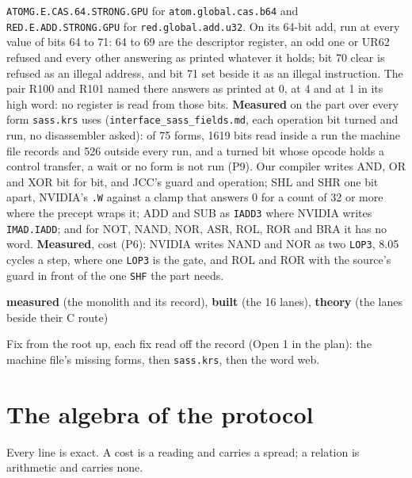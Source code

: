 \begin{description}
\texttt{ATOMG.\allowbreak{}E.\allowbreak{}CAS.\allowbreak{}64.\allowbreak{}STRONG.\allowbreak{}GPU} for \texttt{atom.\allowbreak{}global.\allowbreak{}cas.\allowbreak{}b64} and \texttt{RED.\allowbreak{}E.\allowbreak{}ADD.\allowbreak{}STRONG.\allowbreak{}GPU} for \texttt{red.\allowbreak{}global.\allowbreak{}add.\allowbreak{}u32}. On its 64-bit add, run at every value of bits 64 to 71: 64 to 69 are the descriptor register, an odd one or UR62 refused and every other answering as printed whatever it holds; bit 70 clear is refused as an illegal address, and bit 71 set beside it as an illegal instruction. The pair R100 and R101 named there answers as printed at 0, at 4 and at 1 in its high word: no register is read from those bits. \textbf{Measured} on the part over every form \texttt{sass.\allowbreak{}krs} uses (\texttt{interface\_\allowbreak{}sass\_\allowbreak{}fields.\allowbreak{}md}, each operation bit turned and run, no disassembler asked): of 75 forms, 1619 bits read inside a run the machine file records and 526 outside every run, and a turned bit whose opcode holds a control transfer, a wait or no form is not run (P9). Our compiler writes AND, OR and XOR bit for bit, and JCC's guard and operation; SHL and SHR one bit apart, NVIDIA's \texttt{.\allowbreak{}W} against a clamp that answers 0 for a count of 32 or more where the precept wraps it; ADD and SUB as \texttt{IADD3} where NVIDIA writes \texttt{IMAD.\allowbreak{}IADD}; and for NOT, NAND, NOR, ASR, ROL, ROR and BRA it has no word. \textbf{Measured}, cost (P6): NVIDIA writes NAND and NOR as two \texttt{LOP3}, 8.05 cycles a step, where one \texttt{LOP3} is the gate, and ROL and ROR with the source's guard in front of the one \texttt{SHF} the part needs.
\item[{status}] \textbf{measured} (the monolith and its record), \textbf{built} (the 16 lanes), \textbf{theory} (the lanes beside their C route)
\item[{next}] Fix from the root up, each fix read off the record (Open 1 in the plan): the machine file's missing forms, then \texttt{sass.\allowbreak{}krs}, then the word web.
\end{description}

\section{\texorpdfstring{The algebra of the protocol}{The algebra of the protocol}}

Every line is exact. A cost is a reading and carries a spread; a relation is arithmetic and carries none.

